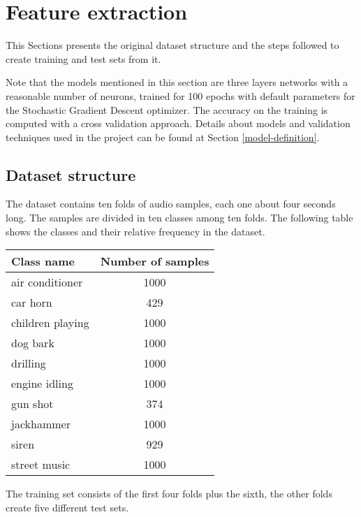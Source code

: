 \section{Feature extraction}
\label{feature-extraction}

This Sections presents the original dataset structure and the 
steps followed to create training and test sets from it.

Note that the models mentioned in this section are
three layers networks with a reasonable number of neurons, trained 
for 100 epochs with default parameters for the Stochastic Gradient 
Descent optimizer. 
The accuracy on the training is computed with a cross validation 
approach.
Details about models and validation techniques used in 
the project can be found at Section \vref{model-definition}.

\subsection{Dataset structure}
\label{dataset-structure}

The dataset contains ten folds of audio samples, each one about 
four seconds long. The samples are divided in ten classes among ten 
folds. The following table shows the classes and their relative frequency 
in the dataset.

\begin{center}
    \begin{tabular}{ |l|c| } 
        \hline
        Class name & Number of samples \\
        \hline
        air conditioner & 1000 \\
        car horn & 429 \\
        children playing & 1000 \\
        dog bark & 1000 \\
        drilling & 1000 \\
        engine idling & 1000 \\
        gun shot & 374 \\
        jackhammer & 1000 \\
        siren & 929 \\
        street music & 1000 \\
        \hline
    \end{tabular}
\end{center}

The training set consists of the first four folds plus the sixth, 
the other folds create five different test sets.

